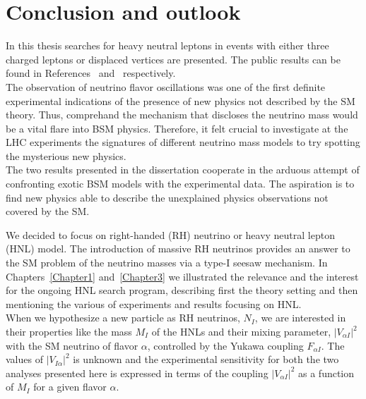 
\chapter{Conclusion and outlook}\label{Chapter7} 

In this thesis searches for heavy neutral leptons in events with either three
charged leptons or displaced vertices are presented. The public
results can be found in References~\cite{Sirunyan:2018mtv} and~\cite{CMS-PAS-EXO-20-009} respectively.\\


The observation of neutrino flavor oscillations was one of the first 
definite experimental indications of the
presence of new physics not described by the SM theory. Thus, 
comprehand the mechanism that discloses the neutrino mass would be a
vital flare into BSM physics. Therefore, it felt crucial to investigate at the LHC
experiments the signatures of different neutrino mass models
to try spotting the mysterious new physics.\\
The two results presented in the dissertation cooperate in the arduous attempt of confronting exotic BSM
models with the experimental data. The aspiration is to find new
physics able to describe the unexplained
physics observations not covered by the SM. 

We decided to focus on right-handed (RH) neutrino or heavy neutral lepton (HNL)
model. The introduction of massive RH
neutrinos provides an answer to the SM problem of the
neutrino masses via a type-I seesaw mechanism.  
In Chapters~\ref{Chapter1} and~\ref{Chapter3} we illustrated
the relevance and the interest for the
ongoing HNL search program, describing first the theory setting 
and then mentioning the various of experiments and results
focusing on HNL.\\
When we hypothesize a new particle as RH neutrinos, $N_{I}$, we
are interested in their properties like the mass $M_I$ of the HNLs and
their mixing parameter, $|V_{\alpha I}|^2$  with the SM neutrino of flavor $\alpha$,
controlled by the Yukawa coupling $F_{\alpha I}$. The values of $|V_{I
  \alpha}|^2$ is unknown and the experimental
sensitivity for both the two analyses presented here is expressed in
terms of the coupling $|V_{\alpha I}|^2$
as a function of $M_I$ for a given flavor $\alpha$. 

